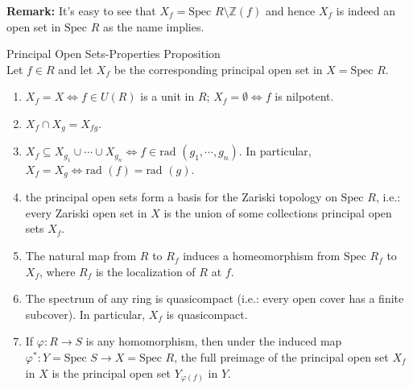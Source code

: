 \noindent\textbf{Remark:} It's easy to see that $X_f= \text{Spec }R \setminus \mathbb{Z} (f)$ and hence $X_f$ is indeed an open set in $\text{Spec }R$ as the name implies.

\begin{proposition}{Principal Open Sets-Properties Proposition}\\
Let $f\in R$ and let $X_f$ be the corresponding principal open set in $X=\text{Spec }R$.
\begin{enumerate}
    \item $X_f =X \Leftrightarrow f\in U(R)$ is a unit in $R$; $X_f= \emptyset \Leftrightarrow f$ is nilpotent.

    \item $X_f \cap X_g=X_{fg}$.
    \item $X_f \subseteq X_{g_1} \cup \cdots \cup X_{g_n} \Leftrightarrow f\in \text{rad } (g_1 ,\cdots, g_n)$. In particular, $X_f =X_g \Leftrightarrow \text{rad }(f) =\text{rad } (g)$.

    \item the principal open sets form a basis for the Zariski topology on $\text{Spec }R$, i.e.: every Zariski open set in $X$ is the union of some collections principal open sets $X_f$.

    \item The natural map from $R$ to $R_f$ induces a homeomorphism from $\text{Spec }R_f$ to $X_f$, where $R_f$ is the localization of $R$ at $f$.

    \item The spectrum of any ring is quasicompact (i.e.: every open cover has a finite subcover). In particular, $X_f$ is quasicompact.

    \item If $\varphi:R \to S$ is any homomorphism, then under the induced map $\varphi^* :Y= \text{Spec }S \to X=\text{Spec }R$, the full preimage of the principal open set $X_f$ in $X$ is the principal open set $Y_{\varphi (f)}$ in $Y$.
\end{enumerate}
\end{proposition}

